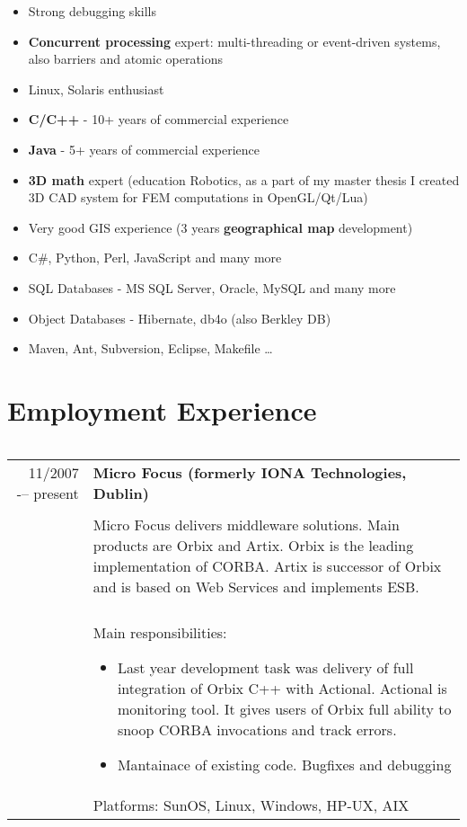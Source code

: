 \documentclass[a4paper,10pt]{article}
\begin{document}
\begin{itemize}
\item Strong debugging skills
\item \textbf{Concurrent processing} expert: multi-threading or event-driven systems, also barriers and atomic operations
\item Linux, Solaris enthusiast
\item \textbf{C/C++} - 10+ years of commercial experience
\item \textbf{Java} - 5+ years of commercial experience
\item \textbf{3D math} expert (education Robotics, as a part of my master thesis I created 3D CAD system for FEM computations in OpenGL/Qt/Lua)
\item Very good GIS experience (3 years \textbf{geographical map} development)
\item C\#, Python, Perl, JavaScript and many more
\item SQL Databases - MS SQL Server, Oracle, MySQL and many more
\item Object Databases - Hibernate, db4o (also Berkley DB)
\item Maven, Ant, Subversion, Eclipse, Makefile …
\end{itemize}

\pagebreak

\section*{Employment Experience}

\begin{tabular}{rp{11cm}} %
\end{tabular}

\begin{tabular}{rp{11cm}}
11/2007 -– present & \textbf{Micro Focus (formerly IONA Technologies, Dublin)}\\\\

& Micro Focus delivers middleware solutions. Main products are Orbix and Artix. Orbix is the leading implementation of CORBA. Artix is successor of Orbix and is based on Web Services and implements ESB.\\\\

& Main responsibilities:
\begin{itemize}
\item Last year development task was delivery of full integration of Orbix C++ with Actional. Actional is monitoring tool. It gives users of Orbix full ability to snoop CORBA invocations and track errors.
\item Mantainace of existing code. Bugfixes and debugging
\end{itemize}\\

& Platforms: SunOS, Linux, Windows, HP-UX, AIX
\end{tabular}
\end{document}
